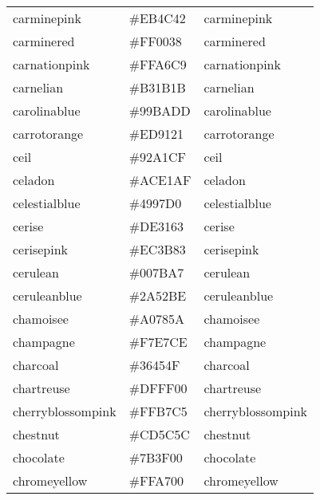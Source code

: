 \documentclass[
]{article}
\begin{document}
\begin{longtable}[]{@{}lll@{}}
carminepink & \colorbox[rgb]{0.92,0.3,0.26}{\#EB4C42} &
\textcolor[rgb]{0.92,0.3,0.26}{carminepink           }\tabularnewline
carminered & \colorbox[rgb]{1.0,0.0,0.22}{\#FF0038} &
\textcolor[rgb]{1.0,0.0,0.22}{carminered            }\tabularnewline
carnationpink & \colorbox[rgb]{1.0,0.65,0.79}{\#FFA6C9} &
\textcolor[rgb]{1.0,0.65,0.79}{carnationpink         }\tabularnewline
carnelian & \colorbox[rgb]{0.7,0.11,0.11}{\#B31B1B} &
\textcolor[rgb]{0.7,0.11,0.11}{carnelian             }\tabularnewline
carolinablue & \colorbox[rgb]{0.6,0.73,0.89}{\#99BADD} &
\textcolor[rgb]{0.6,0.73,0.89}{carolinablue          }\tabularnewline
carrotorange & \colorbox[rgb]{0.93,0.57,0.13}{\#ED9121} &
\textcolor[rgb]{0.93,0.57,0.13}{carrotorange          }\tabularnewline
ceil & \colorbox[rgb]{0.57,0.63,0.81}{\#92A1CF} &
\textcolor[rgb]{0.57,0.63,0.81}{ceil                  }\tabularnewline
celadon & \colorbox[rgb]{0.67,0.88,0.69}{\#ACE1AF} &
\textcolor[rgb]{0.67,0.88,0.69}{celadon               }\tabularnewline
celestialblue & \colorbox[rgb]{0.29,0.59,0.82}{\#4997D0} &
\textcolor[rgb]{0.29,0.59,0.82}{celestialblue         }\tabularnewline
cerise & \colorbox[rgb]{0.87,0.19,0.39}{\#DE3163} &
\textcolor[rgb]{0.87,0.19,0.39}{cerise                }\tabularnewline
cerisepink & \colorbox[rgb]{0.93,0.23,0.51}{\#EC3B83} &
\textcolor[rgb]{0.93,0.23,0.51}{cerisepink            }\tabularnewline
cerulean & \colorbox[rgb]{0.0,0.48,0.65}{\#007BA7} &
\textcolor[rgb]{0.0,0.48,0.65}{cerulean              }\tabularnewline
ceruleanblue & \colorbox[rgb]{0.16,0.32,0.75}{\#2A52BE} &
\textcolor[rgb]{0.16,0.32,0.75}{ceruleanblue          }\tabularnewline
chamoisee & \colorbox[rgb]{0.63,0.47,0.35}{\#A0785A} &
\textcolor[rgb]{0.63,0.47,0.35}{chamoisee             }\tabularnewline
champagne & \colorbox[rgb]{0.97,0.91,0.81}{\#F7E7CE} &
\textcolor[rgb]{0.97,0.91,0.81}{champagne             }\tabularnewline
charcoal & \colorbox[rgb]{0.21,0.27,0.31}{\#36454F} &
\textcolor[rgb]{0.21,0.27,0.31}{charcoal              }\tabularnewline
chartreuse & \colorbox[rgb]{0.87,1.0,0.0}{\#DFFF00} &
\textcolor[rgb]{0.87,1.0,0.0}{chartreuse            }\tabularnewline
cherryblossompink & \colorbox[rgb]{1.0,0.72,0.77}{\#FFB7C5} &
\textcolor[rgb]{1.0,0.72,0.77}{cherryblossompink     }\tabularnewline
chestnut & \colorbox[rgb]{0.8,0.36,0.36}{\#CD5C5C} &
\textcolor[rgb]{0.8,0.36,0.36}{chestnut              }\tabularnewline
chocolate & \colorbox[rgb]{0.48,0.25,0.0}{\#7B3F00} &
\textcolor[rgb]{0.48,0.25,0.0}{chocolate             }\tabularnewline
chromeyellow & \colorbox[rgb]{1.0,0.65,0.0}{\#FFA700} &
\textcolor[rgb]{1.0,0.65,0.0}{chromeyellow          }\tabularnewline

\end{longtable}
\end{document}
